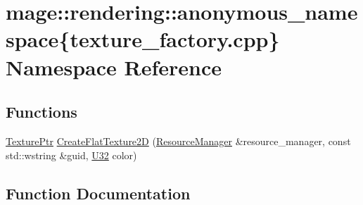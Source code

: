 \hypertarget{namespacemage_1_1rendering_1_1anonymous__namespace_02texture__factory_8cpp_03}{}\section{mage\+:\+:rendering\+:\+:anonymous\+\_\+namespace\{texture\+\_\+factory.\+cpp\} Namespace Reference}
\label{namespacemage_1_1rendering_1_1anonymous__namespace_02texture__factory_8cpp_03}
\subsection*{Functions}
\begin{DoxyCompactItemize}
\item 
\mbox{\hyperlink{namespacemage_1_1rendering_a6f3ae54f825328465b0cdde0f0de4a36}{Texture\+Ptr}} \mbox{\hyperlink{namespacemage_1_1rendering_1_1anonymous__namespace_02texture__factory_8cpp_03_ae6a2e071760eb809d670f2787f68a582}{Create\+Flat\+Texture2D}} (\mbox{\hyperlink{classmage_1_1rendering_1_1_resource_manager}{Resource\+Manager}} \&resource\+\_\+manager, const std\+::wstring \&guid, \mbox{\hyperlink{namespacemage_aa5d6eaabaac3cdd01873d6a3d27e90f3}{U32}} color)
\end{DoxyCompactItemize}


\subsection{Function Documentation}
\mbox{\label{namespacemage_1_1rendering_1_1anonymous__namespace_02texture__factory_8cpp_03_ae6a2e071760eb809d670f2787f68a582}} 
